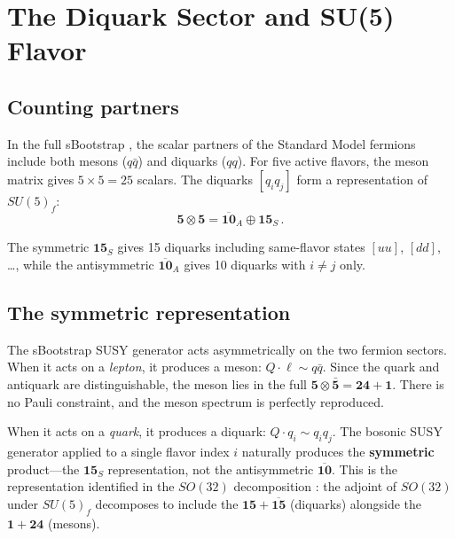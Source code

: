 \documentclass[12pt,a4paper]{article}
\begin{document}
\section{The Diquark Sector and SU(5) Flavor}
\label{sec:diquarks}

\subsection{Counting partners}

In the full sBootstrap \cite{Rivero2005}, the scalar partners of 
the Standard Model fermions include both mesons ($q\bar{q}$) and 
diquarks ($qq$). For five active flavors, the meson matrix gives 
$5 \times 5 = 25$ scalars. The diquarks $[q_i q_j]$ form a 
representation of $SU(5)_f$:
\begin{equation}
\mathbf{5} \otimes \mathbf{5} = \overline{\mathbf{10}}_A 
\oplus \mathbf{15}_S\,.
\end{equation}

The symmetric $\mathbf{15}_S$ gives 15 diquarks including 
same-flavor states $[uu]$, $[dd]$, \ldots, while the antisymmetric 
$\overline{\mathbf{10}}_A$ gives 10 diquarks with $i \neq j$ only.

\subsection{The symmetric representation}
\label{subsec:sym15}

The sBootstrap SUSY generator acts asymmetrically on the two 
fermion sectors. When it acts on a \emph{lepton}, it produces a 
meson: $Q \cdot \ell \sim q\bar{q}$. Since the quark and antiquark 
are distinguishable, the meson lies in the full 
$\mathbf{5} \otimes \bar{\mathbf{5}} = \mathbf{24} + \mathbf{1}$. 
There is no Pauli constraint, and the meson spectrum is perfectly 
reproduced.

When it acts on a \emph{quark}, it produces a diquark: 
$Q \cdot q_i \sim q_i q_j$. The bosonic SUSY generator applied to 
a single flavor index $i$ naturally produces the \textbf{symmetric} 
product---the $\mathbf{15}_S$ representation, not the antisymmetric 
$\overline{\mathbf{10}}$. This is the representation identified 
in the $SO(32)$ decomposition \cite{Rivero2005}: the adjoint of 
$SO(32)$ under $SU(5)_f$ decomposes to include the 
$\mathbf{15} + \overline{\mathbf{15}}$ (diquarks) alongside the 
$\mathbf{1} + \mathbf{24}$ (mesons).
\end{document}
